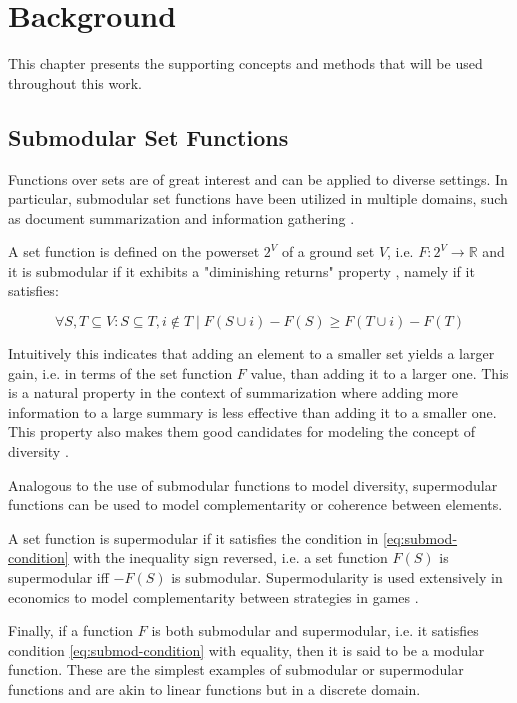 \chapter{Background}
\label{sec:background}

This chapter presents the supporting concepts and methods that will be used throughout this work.

\section{Submodular Set Functions}

Functions over sets are of great interest and can be applied to diverse settings. In particular, submodular set functions have been utilized in multiple domains, such as document summarization and information gathering \citep{krause14submodular}.

A set function is defined on the powerset $2^{V}$ of a ground set $V$, i.e. $F:2^{V} \rightarrow \mathbb{R}$ and it is submodular if it exhibits a "diminishing returns" property , namely if it satisfies:

\begin{equation}
  \label{eq:submod-condition}
  \forall S,T \subseteq V : S \subseteq T, i \notin T \mid F(S \cup i) - F(S) \geq F(T \cup i) - F(T)
\end{equation}

Intuitively this indicates that adding an element to a smaller set yields a larger gain, i.e. in terms of the set function $F$ value, than adding it to a larger one. This is a natural property in the context of summarization where adding more information to a large summary is less effective than adding it to a smaller one. This property also makes them good candidates for modeling the concept of diversity \citep{tschiatschek16learning}.

Analogous to the use of submodular functions to model diversity, supermodular functions can be used to model complementarity or coherence between elements.

A set function is supermodular if it satisfies the condition in \eqref{eq:submod-condition} with the inequality sign reversed, i.e. a set function $F(S)$ is supermodular iff $-F(S)$ is submodular. Supermodularity is used extensively in economics to model complementarity between strategies in games \citep{amir2005supermodularity}.

Finally, if a function $F$ is both submodular and supermodular, i.e. it satisfies condition \eqref{eq:submod-condition} with equality, then it is said to be a modular function. These are the simplest examples of submodular or supermodular functions and are akin to linear functions but in a discrete domain.

